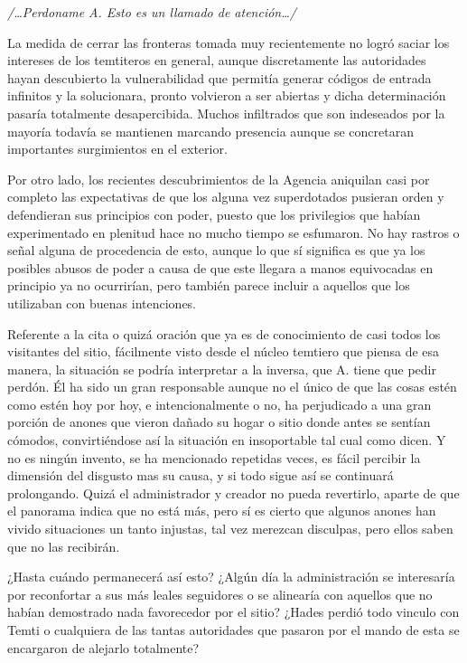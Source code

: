 \documentclass[
]{book}
\begin{document}
\emph{/\ldots Perdoname A. Esto es un llamado de atención\ldots/}

La medida de cerrar las fronteras tomada muy recientemente no logró saciar los intereses de los temtiteros en general, aunque discretamente las autoridades hayan descubierto la vulnerabilidad que permitía generar códigos de entrada infinitos y la solucionara, pronto volvieron a ser abiertas y dicha determinación pasaría totalmente desapercibida. Muchos infiltrados que son indeseados por la mayoría todavía se mantienen marcando presencia aunque se concretaran importantes surgimientos en el exterior.

Por otro lado, los recientes descubrimientos de la Agencia aniquilan casi por completo las expectativas de que los alguna vez superdotados pusieran orden y defendieran sus principios con poder, puesto que los privilegios que habían experimentado en plenitud hace no mucho tiempo se esfumaron. No hay rastros o señal alguna de procedencia de esto, aunque lo que sí significa es que ya los posibles abusos de poder a causa de que este llegara a manos equivocadas en principio ya no ocurrirían, pero también parece incluir a aquellos que los utilizaban con buenas intenciones.

Referente a la cita o quizá oración que ya es de conocimiento de casi todos los visitantes del sitio, fácilmente visto desde el núcleo temtiero que piensa de esa manera, la situación se podría interpretar a la inversa, que A. tiene que pedir perdón. Él ha sido un gran responsable aunque no el único de que las cosas estén como estén hoy por hoy, e intencionalmente o no, ha perjudicado a una gran porción de anones que vieron dañado su hogar o sitio donde antes se sentían cómodos, convirtiéndose así la situación en insoportable tal cual como dicen. Y no es ningún invento, se ha mencionado repetidas veces, es fácil percibir la dimensión del disgusto mas su causa, y si todo sigue así se continuará prolongando. Quizá el administrador y creador no pueda revertirlo, aparte de que el panorama indica que no está más, pero sí es cierto que algunos anones han vivido situaciones un tanto injustas, tal vez merezcan disculpas, pero ellos saben que no las recibirán.

¿Hasta cuándo permanecerá así esto? ¿Algún día la administración se interesaría por reconfortar a sus más leales seguidores o se alinearía con aquellos que no habían demostrado nada favorecedor por el sitio? ¿Hades perdió todo vinculo con Temti o cualquiera de las tantas autoridades que pasaron por el mando de esta se encargaron de alejarlo totalmente?
\end{document}
